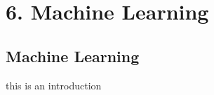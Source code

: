 \documentclass[letterpaper,10pt,english]{jupyterBook}
\begin{document}
\part{6. Machine Learning}


\chapter{Machine Learning}
\label{\detokenize{c6_machine_learning/introduction:machine-learning}}\label{\detokenize{c6_machine_learning/introduction::doc}}
\sphinxAtStartPar
this is an introduction







\renewcommand{\indexname}{Index}
\printindex
\end{document}
